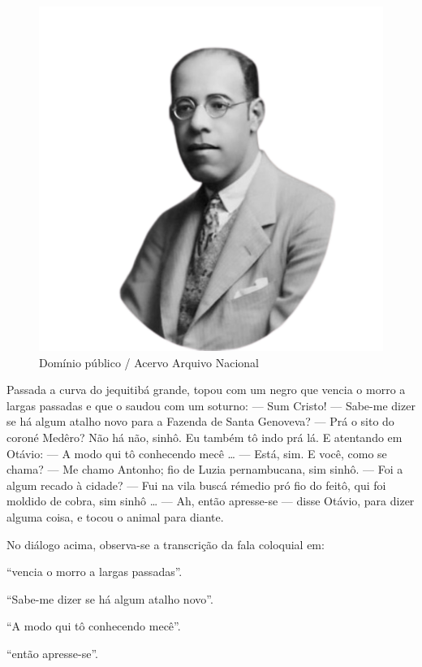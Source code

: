 \begin{myquote}

\begin{figure}[H]
\centering
\includegraphics[scale=0.25]{./imgSAEB_7_POR/media/image59.png}
\caption{Domínio público / Acervo Arquivo Nacional}
\end{figure}

Passada a curva do jequitibá grande, topou com um negro
que vencia o morro a largas passadas e que o saudou com um
soturno:
--- Sum Cristo!
--- Sabe-me dizer se há algum atalho novo para a Fazenda de
Santa Genoveva?
--- Prá o sito do coroné Medêro? Não há não, sinhô. Eu
também tô indo prá lá.
E atentando em Otávio:
--- A modo qui tô conhecendo mecê \ldots{}
--- Está, sim. E você, como se chama?
--- Me chamo Antonho; fio de Luzia pernambucana, sim sinhô.
--- Foi a algum recado à cidade?
--- Fui na vila buscá rémedio pró fio do feitô, qui foi moldido
de cobra, sim sinhô \ldots{}
--- Ah, então apresse-se --- disse Otávio, para dizer alguma
coisa, e tocou o animal para diante.


\end{myquote}

No diálogo acima, observa-se a transcrição da fala coloquial em:

\begin{escolha}
  
  \item ``vencia o morro a largas passadas''.
  
  \item ``Sabe-me dizer se há algum atalho novo''. 
  
  \item ``A modo qui tô conhecendo mecê''.
  
  \item ``então apresse-se''. 

\end{escolha}
